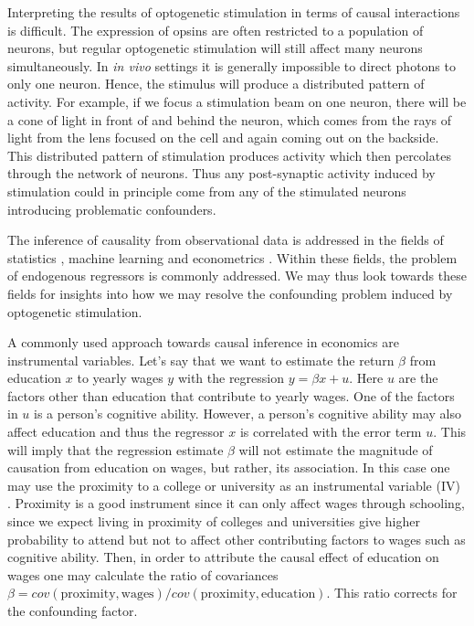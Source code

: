 \documentclass[11pt]{article}
\begin{document}
Interpreting the results of optogenetic stimulation in terms of causal interactions is difficult. The expression of opsins are often restricted to a population of neurons, but regular optogenetic stimulation will still affect many neurons simultaneously. In \textit{in vivo} settings it is generally impossible to direct photons to only one neuron. Hence, the stimulus will produce a distributed pattern of activity. For example, if we focus a stimulation beam on one neuron, there will be a cone of light in front of and behind the neuron, which comes from the rays of light from the lens focused on the cell and again coming out on the backside. This distributed pattern of stimulation produces activity which then percolates through the network of neurons. Thus any post-synaptic activity induced by stimulation could in principle come from any of the stimulated neurons introducing problematic confounders.


The inference of causality from observational data is addressed in the fields of statistics \citep{pearl2009causality}, machine learning \citep{peters2017elements} and econometrics \citep{angrist2008mostly}. Within these fields, the problem of endogenous regressors is commonly addressed. We may thus look towards these fields for insights into how we may resolve the confounding problem induced by optogenetic stimulation. 

A commonly used approach towards causal inference in economics are instrumental variables. Let's say that we want to estimate the return $ \beta $ from education $ x $ to yearly wages $ y $ with the regression $ y = \beta x + u $. Here $ u $ are the factors other than education that contribute to yearly wages. One of the factors in $ u $ is a person's cognitive ability. However, a person's cognitive ability may also affect education and thus the regressor $ x $  is correlated with the error term $ u $. This will imply that the regression estimate $ \beta $ will not estimate the magnitude of causation from education on wages, but rather, its association. In this case one may use the proximity to a college or university as an instrumental variable (IV) \citep{card1993using}. Proximity is a good instrument since it can only affect wages through schooling, since we expect living in proximity of colleges and universities give higher probability to attend but not to affect other contributing factors to wages such as cognitive ability. Then, in order to attribute the causal effect of education on wages one may calculate the ratio of covariances $ \beta = cov(\mathrm{proximity},\mathrm{wages})/cov(\mathrm{proximity},\mathrm{education})$. This ratio corrects for the confounding factor.
\end{document}
